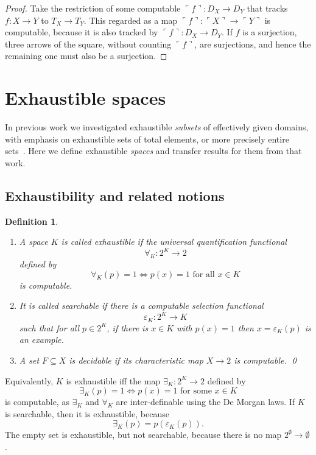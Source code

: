 \documentclass[10pt]{article}
\newcommand{\godel}[1]{\ulcorner #1 \urcorner}
\newtheorem{Def}[cor]{Definition}
\newenvironment{definition}{\begin{Def}\em}{\end{Def}}
\begin{document}
\begin{proof}
  Take the restriction of some computable $\godel{f} \colon D_X \to
  D_Y$ that tracks $f \colon X \to Y$ to $T_X \to T_Y$.  This regarded
  as a map $\godel{f} \colon \godel{X} \to \godel{Y}$ is computable,
  because it is also tracked by $\godel{f} \colon D_X \to D_Y$.  If
  $f$ is a surjection, three arrows of the square, without counting
  $\godel{f}$, are surjections, and hence the remaining one must also
  be a surjection.
\end{proof}

\section{Exhaustible spaces} \label{reformulation}

In previous work we investigated exhaustible \emph{subsets} of effectively
given domains, with emphasis on exhaustible sets of total elements, or
more precisely entire sets~\cite{escardo:exhaustible}. Here we define
exhaustible \emph{spaces} and transfer results for them
from that work. 

\subsection{Exhaustibility and related notions}
\begin{definition} \label{new:exhaustible}
\leavevmode
  \begin{enumerate}
  \item A space $K$ is called \emph{exhaustible} if the universal
    quantification functional \[ \forall_K \colon 2^K \to 2\] defined
    by
   \[
   \forall_K(p)=1 \iff \text{$p(x)=1$ for all $x \in K$}
   \]
   is computable.
 \item It is called \emph{searchable} if there is a
   computable selection functional \[\varepsilon_K \colon 2^K \to K\] such
   that for all $p \in 2^K$, if there is $x \in K$ with $p(x)=1$ then
   $x=\varepsilon_K(p)$ is an example. 
 \item A set $F \subseteq X$ is \emph{decidable} if its characteristic
map $X \to 2$ is computable. \qed
 \end{enumerate}
\end{definition}
\noindent
Equivalently, $K$ is exhaustible iff the map 
$\exists_K \colon 2^K \to 2$ defined by
\[
\exists_K(p)=1 \iff \text{$p(x)=1$ for some $x \in K$}
\]
is computable, as $\exists_K$ and $\forall_K$ are inter-definable
using the De Morgan laws. 
If $K$ is searchable, then it is exhaustible,
because
\[ \exists_K(p)=p(\varepsilon_K(p)).\]
The empty set is exhaustible, but
not searchable, because there is no map $2^\emptyset \to \emptyset$.
\end{document}
